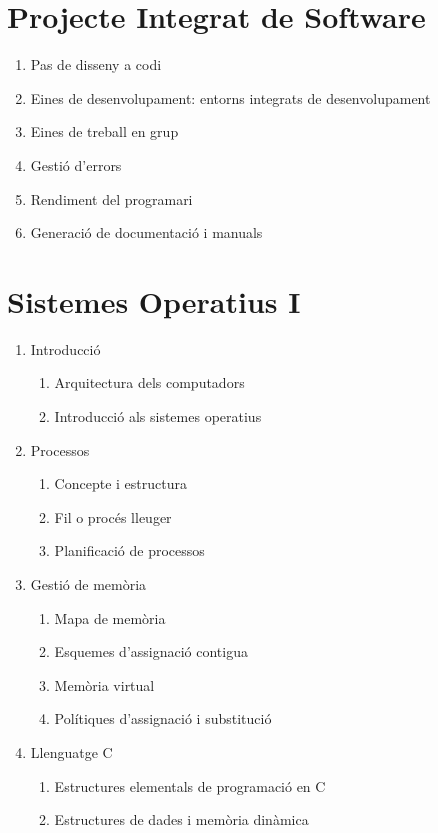 \documentclass{article}
\begin{document}
\section{Projecte Integrat de Software}
\begin{enumerate}
\item Pas de disseny a codi
\item Eines de desenvolupament: entorns integrats de desenvolupament
\item Eines de treball en grup
\item Gestió d’errors
\item Rendiment del programari
\item Generació de documentació i manuals
\end{enumerate}
\newpage

\section{Sistemes Operatius I}
\begin{enumerate}
\item Introducció
	\begin{enumerate}
	\item Arquitectura dels computadors
	\item Introducció als sistemes operatius
	\end{enumerate}
\item Processos
	\begin{enumerate}
	\item Concepte i estructura
	\item Fil o procés lleuger
	\item Planificació de processos
	\end{enumerate}
\item Gestió de memòria
	\begin{enumerate}
	\item Mapa de memòria
	\item Esquemes d’assignació contigua
	\item Memòria virtual
	\item Polítiques d’assignació i substitució
	\end{enumerate}
\item Llenguatge C
	\begin{enumerate}
	\item Estructures elementals de programació en C
	\item Estructures de dades i memòria dinàmica
	\end{enumerate}
\end{enumerate}
\newpage
\end{document}
